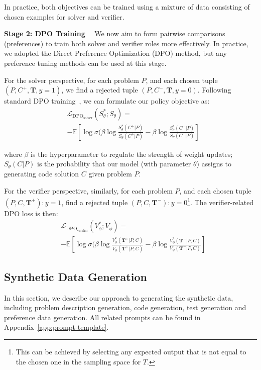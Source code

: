 In practice, both objectives can be trained using a mixture of data consisting of chosen examples for solver and verifier.

\textbf{Stage 2: DPO Training}\ \ 
\label{sec:dpo-training}
We now aim to form pairwise comparisons (preferences) to train both solver and verifier roles more effectively. In practice, we adopted the Direct Preference Optimization (DPO) method, but any preference tuning methods can be used at this stage.

For the solver perspective, for each problem $P$, and each chosen tuple $(P, C^+, \mathbf{T}, y=1)$, we find a rejected tuple $(P, C^-, \mathbf{T}, y=0)$. Following standard DPO training~\cite{rafailov2024direct}, we can formulate our policy objective as:
\begin{align}
    &\mathcal{L}_{\text{DPO}_\text{solver}}(S^*_{\theta}; S_{\theta}) = \nonumber \\ &-\mathbb{E}[\log\sigma(\beta\log \frac{S^*_{\theta}(C^+|P)}{S_{\theta}(C^+|P)} - \beta\log \frac{S^*_{\theta}(C^-|P)}{S_{\theta}(C^-|P)}]
\end{align}

where $\beta$ is the hyperparameter to regulate the strength of weight updates; $S_{\theta}(C|P)$ is the probability that our model (with parameter $\theta$) assigns to generating code solution $C$ given problem $P$.

For the verifier perspective, similarly, for each problem $P$, and each chosen tuple $(P, C, \mathbf{T}^+): y=1$, find a rejected tuple $(P, C, \mathbf{T}^-):y=0$\footnote{This can be achieved by selecting any expected output that is not equal to the chosen one in the sampling space for $T$.}. The verifier-related DPO loss is then:
\begin{align}
    &\mathcal{L}_{\text{DPO}_\text{verifier}}(V^*_{\phi}; V_{\phi}) = \nonumber \\ &-\mathbb{E}[\log\sigma(\beta\log \frac{V^*_{\phi}(\mathbf{T}^+|P, C)}{V_{\phi}(\mathbf{T}^+|P, C)} - \beta\log \frac{V^*_{\phi}(\mathbf{T}^-|P, C)}{V_{\phi}(\mathbf{T}^-|P, C)}]
\end{align}

\subsection{Synthetic Data Generation}
\label{sec:practical-settings}
In this section, we describe our approach to generating the synthetic data, including problem description generation, code generation, test generation and preference data generation. All related prompts can be found in Appendix~\ref{app:prompt-template}.

